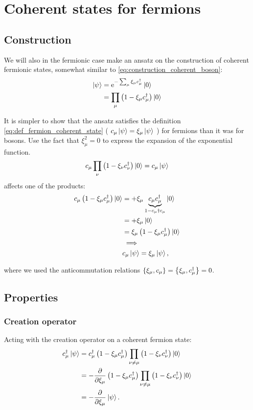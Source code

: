 \section{Coherent states for fermions}

\subsection{Construction}

We will also in the fermionic case make an ansatz on the construction of coherent fermionic states, somewhat similar to \eqref{eq:construction_coherent_boson}:
\begin{align}
\ket \psi &= \mathrm{e}^{-\sum_\mu\xi_\mu c_\mu^\dagger}\ket 0 \\
&= \prod_\mu \left(1-\xi_\mu c_\mu^\dagger\right)\ket 0
\end{align}

It is simpler to show that the ansatz satisfies the definition \eqref{eq:def_fermion_coherent_state} ( \( c_\mu \ket{\psi} = \xi_\mu\ket{\psi}\) ) for fermions than it was for bosons. Use the fact that \(\xi_\mu^2 = 0\) to express the expansion of the exponential function. 
\begin{equation}
c_\mu\prod_\nu\left(1-\xi_\nu c_\nu^\dagger\right)\ket 0 = c_\mu \ket \psi
\end{equation}
affects one of the products:
\begin{align}
c_\mu\left(1-\xi_\mu c_\mu^\dagger\right)\ket 0 &= +\xi_\mu \underbrace{c_\mu c_\mu^\dagger}_{1-c_\mu\dagger c_\mu}\ket 0 \\
&= +\xi_\mu \ket 0  \\
&= \xi_\mu\left(1-\xi_\mu c_\mu^\dagger\right)\ket 0 \\
&\implies \nonumber\\
 &c_\mu\ket \psi = \xi_\mu\ket\psi,
\end{align} 

where we used the anticommutation relations \(\acomm{\xi_\mu}{c_\mu} = \acomm{\xi_\mu}{c_\mu^\dagger} =0\).

\subsection{Properties}
\subsubsection*{Creation operator}
Acting with the creation operator on a coherent fermion state:
\begin{align*}
c_\mu^\dagger\ket\psi &= c_\mu^\dagger\left(1-\xi_\mu c_\mu^\dagger\right)\prod_{\nu \ne \mu}\left(1-\xi_\nu c_\nu^\dagger\right)\ket 0\\
&= -\pdv{\xi_\mu}\left(1-\xi_\mu c_\mu^\dagger\right)\prod_{\nu \ne \mu}\left(1-\xi_\nu c_\nu^\dagger\right)\ket 0 \\
&= -\pdv{\xi_\mu}\ket \psi.
\end{align*}

